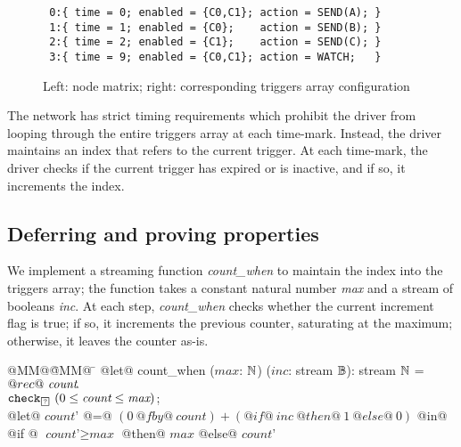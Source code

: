 \begin{figure}
  \begin{minipage}{0.5\textwidth}
\end{minipage}
\begin{minipage}{0.49\textwidth}
\scriptsize
\begin{verbatim}
 0:{ time = 0; enabled = {C0,C1}; action = SEND(A); }
 1:{ time = 1; enabled = {C0};    action = SEND(B); }
 2:{ time = 2; enabled = {C1};    action = SEND(C); }
 3:{ time = 9; enabled = {C0,C1}; action = WATCH;   }
\end{verbatim}
\end{minipage}

\caption{Left: node matrix; right: corresponding triggers array configuration}
\label{f:tt-systemmatrix-ok}
\end{figure}

The network has strict timing requirements which prohibit the driver from looping through the entire triggers array at each time-mark.
Instead, the driver maintains an index that refers to the current trigger.
At each time-mark, the driver checks if the current trigger has expired or is inactive, and if so, it increments the index.

\subsection{Deferring and proving properties}

We implement a streaming function \emph{count_when} to maintain the index into the triggers array; the function takes a constant natural number \emph{max} and a stream of booleans \emph{inc}.
At each step, \emph{count_when} checks whether the current increment flag is true; if so, it increments the previous counter, saturating at the maximum; otherwise, it leaves the counter as-is.

\begin{tabbing}
  @MM@\= @MM@ \= \kill
  @let@ count_when ($\textit{max}$: $\mathbb{N}$) ($\textit{inc}$: stream $\mathbb{B}$): stream $\mathbb{N}$ = \\
    \> $@rec@~\textit{count}\hspace{-0.1em}.~$ \\
    \> \> $\xcheckP{\PSUnknown}{(0 \le \textit{count} \le \textit{max})}$; \\
    \> \> @let@ $\textit{count'}$ @=@ $(0~@fby@~\textit{count}) + (@if@~\textit{inc}~@then@~1~@else@~0)$ @in@ \\
    \> \> @if @ $\textit{count'} \ge \textit{max}$ @then@ $\textit{max}$  @else@ $\textit{count'}$
\end{tabbing}

